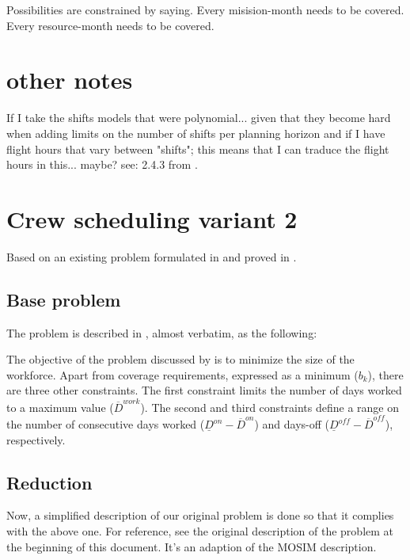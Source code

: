 \documentclass[a4paper,11pt]{article}
\begin{document}
Possibilities are constrained by saying.
Every misision-month needs to be covered.
Every resource-month needs to be covered.

\clearpage


\section{other notes}

If I take the shifts models that were polynomial... given that they become hard when adding limits on the number of shifts per planning horizon and if I have flight hours that vary between "shifts"; this means that I can traduce the flight hours in this... maybe? see: 2.4.3 from \cite{Smet2015}.


\clearpage

\section{Crew scheduling variant 2}

    Based on an existing problem formulated in \cite{Smet2015} and proved in \cite{Brunner2013}.


    \subsection{Base problem}

    The problem is described in \cite{Smet2015}, almost verbatim, as the following:

    The objective of the problem discussed by \cite{Brunner2013} is to minimize the size of the workforce. Apart from coverage requirements, expressed as a minimum ($b_{k}$), there are three other constraints. The first constraint limits the number of days worked to a maximum value ($\overline{D}^{work}$). The second and third constraints define a range on the number of consecutive days worked ($\underline{D}^{on} - \overline{D}^{on}$) and days-off ($\underline{D}^{off} - \overline{D}^{off}$), respectively.

    \subsection{Reduction}

    Now, a simplified description of our original problem is done so that it complies with the above one. For reference, see the original description of the problem at the beginning of this document. It's an adaption of the MOSIM description.
\end{document}
